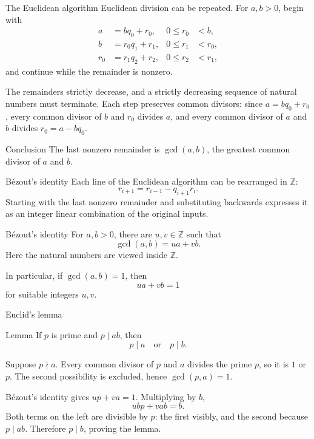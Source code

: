 \documentclass[aspectratio=169,11pt]{beamer}
\newcommand{\Z}{\mathbb Z}
\begin{document}
\begin{frame}{The Euclidean algorithm}
  Euclidean division can be repeated.  For \(a,b>0\), begin with
  \begin{align*}
    a&=bq_0+r_0,       &0\le r_0&<b,\\
    b&=r_0q_1+r_1,     &0\le r_1&<r_0,\\
    r_0&=r_1q_2+r_2,   &0\le r_2&<r_1,
  \end{align*}
  and continue while the remainder is nonzero.

  The remainders strictly decrease, and a strictly decreasing sequence of
  natural numbers must terminate.  Each step preserves common divisors:
  since \(a=bq_0+r_0\), every common divisor of \(b\) and \(r_0\) divides
  \(a\), and every common divisor of \(a\) and \(b\) divides \(r_0=a-bq_0\).

  \begin{block}{Conclusion}
    The last nonzero remainder is \(\gcd(a,b)\), the greatest common divisor
    of \(a\) and \(b\).
  \end{block}
\end{frame}

\begin{frame}{Bézout's identity}
  Each line of the Euclidean algorithm can be rearranged in \(\Z\):
  \[
    r_{i+1}=r_{i-1}-q_{i+1}r_i.
  \]
  Starting with the last nonzero remainder and substituting backwards
  expresses it as an integer linear combination of the original inputs.

  \begin{block}{Bézout's identity}
    For \(a,b>0\), there are \(u,v\in\Z\) such that
    \[
      \boxed{\gcd(a,b)=ua+vb.}
    \]
    Here the natural numbers are viewed inside \(\Z\).
  \end{block}

  In particular, if \(\gcd(a,b)=1\), then
  \[
    ua+vb=1
  \]
  for suitable integers \(u,v\).
\end{frame}

\begin{frame}{Euclid's lemma}
  \begin{block}{Lemma}
    If \(p\) is prime and \(p\mid ab\), then
    \[
      \boxed{p\mid a\quad\text{or}\quad p\mid b.}
    \]
  \end{block}

  Suppose \(p\nmid a\).  Every common divisor of \(p\) and \(a\) divides
  the prime \(p\), so it is \(1\) or \(p\).  The second possibility is
  excluded, hence \(\gcd(p,a)=1\).

  Bézout's identity gives \(up+va=1\).  Multiplying by \(b\),
  \[
    ubp+vab=b.
  \]
  Both terms on the left are divisible by \(p\): the first visibly, and the
  second because \(p\mid ab\).  Therefore \(p\mid b\), proving the lemma.
\end{frame}
\end{document}
